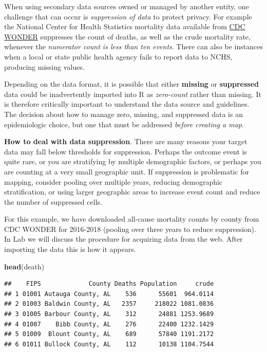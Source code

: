 \documentclass[
]{book}
\newenvironment{Shaded}{\begin{snugshade}}{\end{snugshade}}
\newcommand{\FunctionTok}[1]{\textcolor[rgb]{0.13,0.29,0.53}{\textbf{#1}}}
\newcommand{\NormalTok}[1]{#1}
\newenvironment{rmdcaution}[1]
  {
  \begin{itemize}
  \renewcommand{\labelitemi}{
    \raisebox{-.7\height}[0pt][0pt]{
      {\setkeys{Gin}{width=3em,keepaspectratio}\texttt{[image: images/\#1]}}
    }
  }
  \setlength{\fboxsep}{1em}
  \begin{caution}
  \item
  }
  {
  \end{caution}
  \end{itemize}
  }
\newenvironment{rmdtip}[1]
  {
  \begin{itemize}
  \renewcommand{\labelitemi}{
    \raisebox{-.7\height}[0pt][0pt]{
      {\setkeys{Gin}{width=3em,keepaspectratio}\texttt{[image: images/\#1]}}
    }
  }
  \setlength{\fboxsep}{1em}
  \begin{tip}
  \item
  }
  {
  \end{tip}
  \end{itemize}
  }
\begin{document}
When using secondary data sources owned or managed by another entity, one challenge that can occur is \emph{suppression of data} to protect privacy. For example the National Center for Health Statistics mortality data available from \href{https://wonder.cdc.gov/}{CDC WONDER} suppresses the count of deaths, as well as the crude mortality rate, whenever the \emph{numerator count is less than ten events}. There can also be instances when a local or state public health agency fails to report data to NCHS, producing missing values.

\begin{rmdcaution}{caution}
Depending on the data format, it is possible that either \textbf{missing} or \textbf{suppressed} data could be inadvertently imported into R as \emph{zero-count} rather than missing. It is therefore critically important to understand the data source and guidelines. The decision about how to manage zero, missing, and suppressed data is an epidemiologic choice, but one that must be addressed \emph{before creating a map}.

\end{rmdcaution}

\begin{rmdtip}{tip}
\textbf{How to deal with data suppression}. There are many reasons your target data may fall below thresholds for suppression. Perhaps the outcome event is quite rare, or you are stratifying by multiple demographic factors, or perhaps you are counting at a very small geographic unit. If suppression is problematic for mapping, consider pooling over multiple years, reducing demographic stratification, or using larger geographic areas to increase event count and reduce the number of suppressed cells.

\end{rmdtip}

For this example, we have downloaded all-cause mortality counts by county from CDC WONDER for 2016-2018 (pooling over three years to reduce suppression). In Lab we will discuss the procedure for acquiring data from the web. After importing the data this is how it appears.

\begin{Shaded}
\begin{Highlighting}[]
\FunctionTok{head}\NormalTok{(death)}
\end{Highlighting}
\end{Shaded}

\begin{verbatim}
##    FIPS             County Deaths Population     crude
## 1 01001 Autauga County, AL    536      55601  964.0114
## 2 01003 Baldwin County, AL   2357     218022 1081.0836
## 3 01005 Barbour County, AL    312      24881 1253.9689
## 4 01007    Bibb County, AL    276      22400 1232.1429
## 5 01009  Blount County, AL    689      57840 1191.2172
## 6 01011 Bullock County, AL    112      10138 1104.7544
\end{verbatim}
\end{document}

